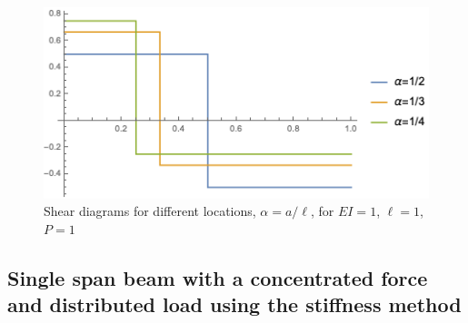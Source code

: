 \documentclass[11pt, oneside]{article}   	%
\begin{document}
\begin{figure}[htbp]
    \begin{center}
        \includegraphics[]{forceShear.png}
        \caption{Shear diagrams for different locations, $\alpha=a/\ell$, for $EI=1$, $\ell=1$, $P=1$}
        \label{default4}
    \end{center}
\end{figure}

\subsection{Single span beam with a concentrated force and distributed load using the stiffness method}

\begin{equation}
   \label{C1}
\end{equation}
\begin{equation}
   \label{C2}
\end{equation}
\begin{equation}
   \label{C3}
\end{equation}
\begin{equation}
   \label{C4}
\end{equation}
\begin{equation}
   \label{C5}
\end{equation}
\begin{equation}
   \label{C6}
\end{equation}
\begin{equation}
   \label{C7}
\end{equation}
\begin{equation}
   \label{C8}
\end{equation}
\begin{equation}
   \label{C9}
\end{equation}
\begin{equation}
   \label{C10}
\end{equation}
\end{document}
